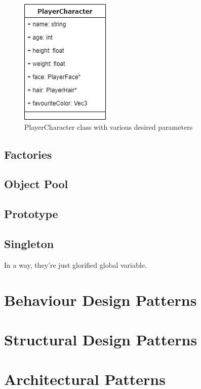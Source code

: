 \documentclass[10pt,letterpaper]{article}
\begin{document}
\begin{multicols}{2}
\begin{figure}[H]
	\centering
	\includegraphics[scale=0.5]{assets/playercharacter_class}
	\caption{PlayerCharacter class with various desired parameters}
	\label{fig:playercharacter-1}
\end{figure}

\subsection{Factories}

\subsection{Object Pool}

\subsection{Prototype}

\subsection{Singleton}

In a way, they're just glorified global variable.


\section{Behaviour Design Patterns}

\section{Structural Design Patterns}

\section{Architectural Patterns}


\end{multicols}
\end{document}
